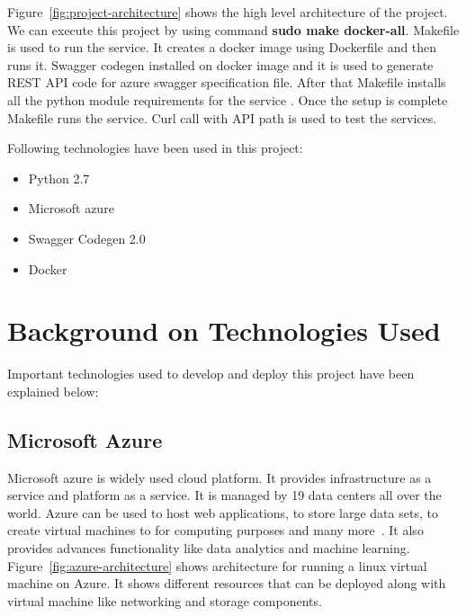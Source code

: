 Figure~\ref{fig:project-architecture} shows the high level architecture of the
project. We can execute this project by using command \textbf{sudo make
docker-all}. Makefile is used to run the service. It creates a docker image
using Dockerfile and then runs it. Swagger codegen installed on docker image
and it is used to generate REST API code for azure swagger specification file.
After that Makefile installs all the python module requirements for the service
. Once the setup is complete Makefile runs the service. Curl call with API path
is used to test the services.



Following technologies have been used in this project:
\begin{itemize}
\item Python 2.7
\item Microsoft azure
\item Swagger Codegen 2.0
\item Docker
\end{itemize}

\section{Background on Technologies Used}
Important technologies used to develop and deploy this project have been
explained below:

\subsection{Microsoft Azure}
Microsoft azure is widely used cloud platform. It provides infrastructure as a
service and platform as a service. It is managed by 19 data centers all over
the world. Azure can be used to host web applications, to store large data
sets, to create virtual machines to for computing purposes and many
more~\cite{hid-sp18-502-microsoft-azure}. It also provides advances
functionality like data analytics and machine learning.
Figure~\ref{fig:azure-architecture} shows architecture for running a linux
virtual machine on Azure. It shows different resources that can be deployed
along with virtual machine like networking and storage components.

